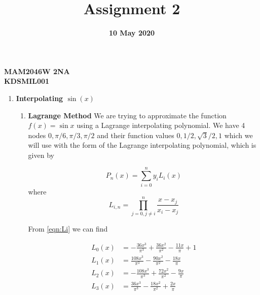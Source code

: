 \documentclass[12pt]{article}
\title{Assignment 2}
\date{\textbf{10 May 2020}}
\author{}
\begin{document}
    \maketitle
    \begin{center}
    \textbf{\large{MAM2046W 2NA}}\\
    \textbf{\large{KDSMIL001}}\\
    \end{center}

    \begin{enumerate}
        \section*{Analytical Problems}
        \item \textbf{Interpolating $\sin(x)$}\newline
        \begin{enumerate}
            \item \textbf{Lagrange Method}
            We are trying to approximate the function $f(x) = \sin x$ using a Lagrange interpolating 
            polynomial. We have 4 nodes $0, \pi/6, \pi/3, \pi/2$ and their function values $0, 1/2, \sqrt{3}/2, 1$ 
            which we will use with the form of the Lagrange interpolating polynomial, which is given by

            \begin{equation}
                P_{n}(x) = \sum_{i=0}^{n} y_i L_i(x)
                \label{eqn:Lagrange Polynomial Form}
            \end{equation}
            where
            \begin{equation}
                L_{i,n} = \prod_{j=0, j\neq i}^{n} \frac{x-x_j}{x_i-x_j}
                \label{eqn:Li}
            \end{equation}

            From \autoref{eqn:Li} we can find

            \begin{equation*}
                \begin{split}
                    L_0(x) &= -\frac{36x^3}{\pi^3}+\frac{36x^2}{\pi^2}-\frac{11x}{\pi}+1 \\
                    L_1(x) &= \frac{108x^3}{\pi^3}-\frac{90x^2}{\pi^2}-\frac{18x}{\pi} \\
                    L_2(x) &= -\frac{108x^3}{\pi^3}+\frac{72x^2}{\pi^2}-\frac{9x}{\pi} \\
                    L_3(x) &= \frac{36x^3}{\pi^3}-\frac{18x^2}{\pi^2}+\frac{2x}{\pi} 
                \end{split}
            \end{equation*}
            

\end{enumerate}
\end{enumerate}
\end{document}
